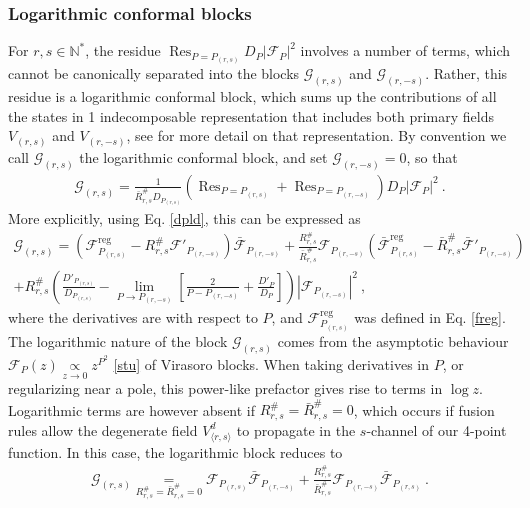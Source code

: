\documentclass[12pt, a4paper]{article}
\begin{document}
\subsubsection{Logarithmic conformal blocks}\label{sec:log}

For $r,s\in\mathbb{N}^*$, the residue $\operatorname{Res}_{P=P_{(r,s)}}D_P\left|\mathcal{F}_{P}\right|^2$ 
involves a number of terms, which cannot be canonically separated into the blocks 
$\mathcal{G}_{(r,s)}$ and $\mathcal{G}_{(r,-s)}$. Rather, this residue is a logarithmic conformal block, which sums up the contributions of all the states in 1 indecomposable representation that includes both primary fields $V_{(r,s)}$ and $V_{(r,-s)}$, see \cite{nr20} for more detail on that representation. By convention we call $\mathcal{G}_{(r,s)}$ the logarithmic conformal block, and set $\mathcal{G}_{(r,-s)}=0$, so that 
\begin{align}
 \mathcal{G}_{(r,s)} = \frac{1}{\bar R^{\#}_{r,s} D_{P_{(r,s)}}} \left( \operatorname{Res}_{P=P_{(r,s)}} + \operatorname{Res}_{P=P_{(r,-s)}}\right)D_P\left|\mathcal{F}_{P}\right|^2 \ . 
\end{align}
More explicitly, using Eq. \eqref{dpld}, this can be expressed as 
\begin{multline}
  \mathcal{G}_{(r,s)} = \left(\mathcal{F}^\text{reg}_{P_{(r,s)}} -R^{\#}_{r,s} \mathcal{F}'_{P_{(r,-s)}}\right) \bar{\mathcal{F}}_{P_{(r,-s)}} 
  + \frac{R^{\#}_{r,s}}{\bar{R}^{\#}_{r,s}} \mathcal{F}_{P_{(r,-s)}} \left(\bar{\mathcal{F}}^\text{reg}_{P_{(r,s)}} -\bar R^{\#}_{r,s} \bar{\mathcal{F}}'_{P_{(r,-s)}}\right)
  \\
  + R^{\#}_{r,s} \left( \frac{D'_{P_{(r,s)}}}{D_{P_{(r,s)}}} - \lim_{P\to P_{(r,-s)}}\left[\frac{2}{P-P_{(r,-s)}} +\frac{D'_P}{D_P}\right]\right)
  \left|\mathcal{F}_{P_{(r,-s)}}\right|^2 
  \ ,
\end{multline}
where the derivatives are with respect to $P$, and
$\mathcal{F}^\text{reg}_{P_{(r,s)}}$ was defined in Eq. \eqref{freg}.
The logarithmic nature of the block $\mathcal{G}_{(r,s)}$ comes from the asymptotic behaviour $\mathcal{F}_P(z)\underset{z\to 0}{\propto} z^{P^2} $ \eqref{stu} of Virasoro blocks. When taking derivatives in $P$, or regularizing near a pole, this power-like prefactor gives rise to terms in $\log z$. Logarithmic terms are however absent if $R^{\#}_{r,s}=\bar R^{\#}_{r,s}=0$, which occurs if fusion rules allow the degenerate field $V^d_{\langle r,s\rangle}$ to propagate in the $s$-channel of our 4-point function. In this case, the logarithmic block reduces to 
\begin{align}
 \mathcal{G}_{(r,s)} \underset{R^{\#}_{r,s}=\bar R^{\#}_{r,s}=0}{=} 
 \mathcal{F}_{P_{(r,s)}}  \bar{\mathcal{F}}_{P_{(r,-s)}} + 
 \frac{R^{\#}_{r,s}}{\bar{R}^{\#}_{r,s}} \mathcal{F}_{P_{(r,-s)}} \bar{\mathcal{F}}_{P_{(r,s)}} \ .
\end{align}
\end{document}
